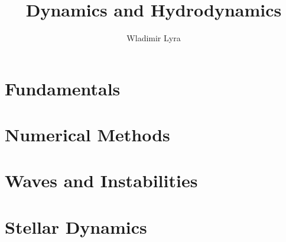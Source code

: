 \documentclass[a4paper,10pt]{book}
\begin{document}
\title{Dynamics and Hydrodynamics}
\author{Wladimir Lyra}
\date{}
\maketitle


\frontmatter
\tableofcontents

\mainmatter


\part{Fundamentals}




\part{Numerical Methods}



\part{Waves and Instabilities}




\part{Stellar Dynamics}


\appendix





%

\backmatter



\end{document}
